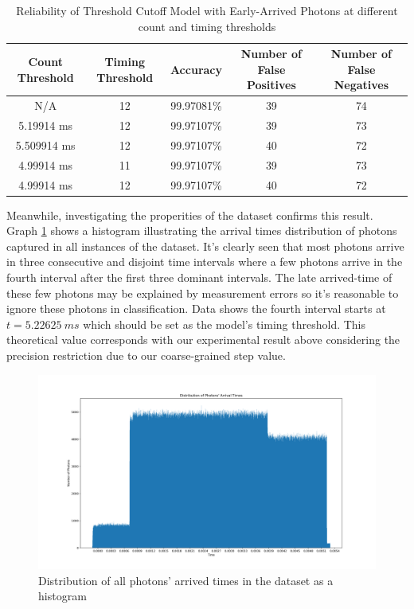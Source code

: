 \documentclass[letterpaper,twocolumn,10pt]{article}
\begin{document}
\begin{table}
    \caption{Reliability of Threshold Cutoff Model with Early-Arrived Photons at different count and timing thresholds}
    \begin{center}
        \begin{tabular}{c c c c c}
            Count Threshold & Timing Threshold & Accuracy & Number of False Positives & Number of False Negatives \\ [0.5ex] 
            \hline
            N/A	& 12 & 99.97081\% & 39 & 74 \\
            5.19914	ms & 12 & 99.97107\% & 39 & 73 \\ 
            5.509914 ms & 12 & 99.97107\% & 40 & 72 \\
            4.99914 ms & 11 & 99.97107\% & 39 & 73 \\
            4.99914 ms & 12 & 99.97107\% & 40 & 72 \\
       \end{tabular}
    \end{center}
    \label{table:threshold_cutoff_early_arrival}  
\end{table}

Meanwhile, investigating the properities of the dataset confirms this result. Graph \ref{fig:distro_photons_arrival_times} shows a histogram illustrating the arrival times distribution of photons captured in all instances of the dataset. It's clearly seen that most photons arrive in three consecutive and disjoint time intervals where a few photons arrive in the fourth interval after the first three dominant intervals. The late arrived-time of these few photons may be explained by measurement errors so it's reasonable to ignore these photons in classification. Data shows the fourth interval starts at $t = 5.22625 \ ms$ which should be set as the model's timing threshold. This theoretical value corresponds with our experimental result above considering the precision restriction due to our coarse-grained step value.

\begin{figure}
    \includegraphics[width=\linewidth]{Figures/distro_photons_arrival_times.png}
    \centering
    \caption{Distribution of all photons' arrived times in the dataset as a histogram}
    \label{fig:distro_photons_arrival_times}
\end{figure}
\end{document}
